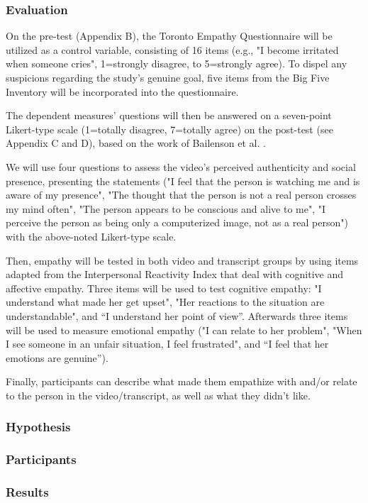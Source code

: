 \subsubsection{Evaluation}
On the pre-test (Appendix B), the Toronto Empathy Questionnaire \cite{SPR03} will be utilized as a control variable, consisting of 16 items (e.g., "I become irritated when someone cries", 1=strongly disagree, to 5=strongly agree). To dispel any suspicions regarding the study's genuine goal, five items from the Big Five Inventory \cite{JOH91} will be incorporated into the questionnaire.

The dependent measures' questions will then be answered on a seven-point Likert-type scale (1=totally disagree, 7=totally agree) on the post-test (see Appendix C and D), based on the work of Bailenson et al. \cite{BAI03}.

We will use four questions to assess the video's perceived authenticity and social presence, presenting the statements ("I feel that the person is watching me and is aware of my presence", "The thought that the person is not a real person crosses my mind often", "The person appears to be conscious and alive to me", "I perceive the person as being only a computerized image, not as a real person") with the above-noted Likert-type scale.

Then, empathy will be tested in both video and transcript groups by using items adapted from the Interpersonal Reactivity Index \cite{DAV83} that deal with cognitive and affective empathy. Three items will be used to test cognitive empathy: "I understand what made her get upset", "Her reactions to the situation are understandable", and “I understand her point of view”. Afterwards three items will be used to measure emotional empathy ("I can relate to her problem", "When I see someone in an unfair situation, I feel frustrated", and “I feel that her emotions are genuine”).

Finally, participants can describe what made them empathize with and/or relate to the person in the video/transcript, as well as what they didn't like.

\subsubsection{Hypothesis}

\subsubsection{Participants}

\subsubsection{Results}
